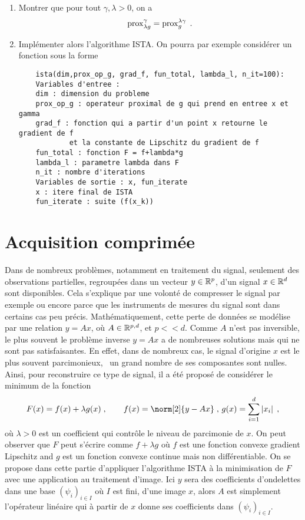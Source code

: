 \documentclass[a4paper,french,12pt]{article}
\begin{document}
\begin{enumerate}
\item Montrer que pour tout $\gamma, \lambda >0$, on a
  \begin{equation*}
    \operatorname{prox}_{\lambda g}^{\gamma} = \operatorname{prox}_{ g}^{\lambda \gamma} \;.
  \end{equation*}
\item Implémenter alors l'algorithme ISTA. On pourra par exemple considérer un fonction
  sous la forme
  \begin{lstlisting}
    ista(dim,prox_op_g, grad_f, fun_total, lambda_l, n_it=100):
    Variables d'entree :
    dim : dimension du probleme
    prox_op_g : operateur proximal de g qui prend en entree x et gamma
    grad_f : fonction qui a partir d'un point x retourne le gradient de f
            et la constante de Lipschitz du gradient de f
    fun_total : fonction F = f+lambda*g
    lambda_l : parametre lambda dans F
    n_it : nombre d'iterations
    Variables de sortie : x, fun_iterate
    x : itere final de ISTA
    fun_iterate : suite (f(x_k))
  \end{lstlisting}
\end{enumerate}

\section{Acquisition comprimée}
%
Dans de nombreux problèmes, notamment en traitement du signal,
seulement des observations partielles, regroupées dans un vecteur
$y \in \mathbb{R}^p$, d'un signal $x \in \mathbb{R}^d$ sont disponibles. Cela
s'explique par une volonté de compresser le signal par exemple ou
encore parce que les instruments de mesures du signal sont dans
certains cas peu précis. Mathématiquement, cette perte de données se
modélise par une relation $y=Ax$, où $A \in \mathbb{R}^{p,d}$, et $p <<
d$. Comme $A$ n'est pas inversible, le plus souvent le problème
inverse $y=Ax$ a de nombreuses solutions mais qui ne sont pas
satisfaisantes. En effet, dans de nombreux cas, le signal d'origine
$x$ est le plus souvent parcimonieux, \ie~un grand nombre de ses
composantes sont nulles. Ainsi, pour reconstruire ce type de signal,
il a été proposé de considérer le minimum de la fonction
\begin{equation*}
  F(x) = f(x) + \lambda g(x) \eqsp, \qquad f(x) = \norm[2]{y-Ax} \eqsp, \,  g(x) =  \sum_{i=1}^d \abs{x_i} \eqsp,
\end{equation*}
où $\lambda >0$ est un coefficient qui contrôle le niveau de
parcimonie de $x$.  On peut observer que $F$ peut s'écrire comme $f+\lambda g$
où $f$ est une fonction convexe gradient Lipschitz and $g$ est un
fonction convexe continue mais non différentiable. On se propose dans
cette partie d'appliquer l'algorithme ISTA à la minimisation de $F$
avec une application au traitement d'image. Ici $y$ sera des
coefficients d'ondelettes dans une base $(\psi_i)_{i \in I}$ où $I$
est fini, d'une image $x$, alors $A$ est simplement l'opérateur
linéaire qui à partir de $x$ donne ses coefficients dans
$(\psi_i)_{i \in I}$.
\end{document}
